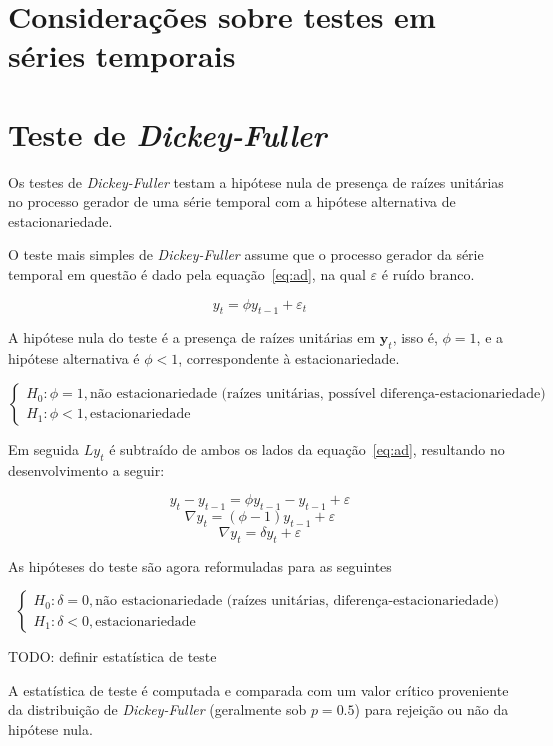\section{Considerações sobre testes em séries temporais}

\section{Teste de \emph{Dickey-Fuller}}

Os testes de \emph{Dickey-Fuller} testam a hipótese nula de presença de raízes
unitárias no processo gerador de uma série temporal com a hipótese alternativa
de estacionariedade.

O teste mais simples de \emph{Dickey-Fuller} assume que o processo gerador da
série temporal em questão é dado pela equação~\ref{eq:ad}, na qual
$\varepsilon$ é ruído branco.

\begin{equation}\label{eq:ad}
    y_t = \phi y_{t-1} + \varepsilon_t
\end{equation}

A hipótese nula do teste é a presença de raízes unitárias em $\mathbf{y}_t$,
isso é, $\phi = 1$, e a hipótese alternativa é $\phi < 1$, correspondente à
estacionariedade.

$$
\begin{cases}
    H_0: \phi = 1, \text{não estacionariedade (raízes unitárias, possível diferença-estacionariedade)} \\
    H_1: \phi < 1, \text{estacionariedade}
\end{cases}
$$

Em seguida $Ly_t$ é subtraído de ambos os lados da equação~\ref{eq:ad},
resultando no desenvolvimento a seguir:

$$ y_t - y_{t-1} = \phi y_{t-1} - y_{t-1} + \varepsilon $$
$$ \nabla y_t = (\phi - 1) y_{t-1}  + \varepsilon $$
$$ \nabla y_t = \delta y_t  + \varepsilon $$

As hipóteses do teste são agora reformuladas para as seguintes

$$
\begin{cases}
    H_0: \delta = 0, \text{não estacionariedade (raízes unitárias, diferença-estacionariedade)} \\
    H_1: \delta < 0, \text{estacionariedade}
\end{cases}
$$

TODO: definir estatística de teste

A estatística de teste é computada e comparada com um valor crítico proveniente
da distribuição de \emph{Dickey-Fuller} (geralmente sob $p=0.5$) para rejeição
ou não da hipótese nula.

